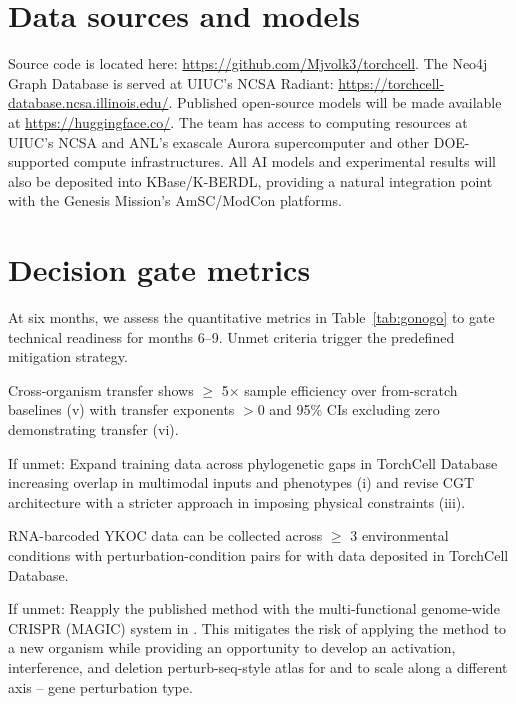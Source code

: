 
\section{Data sources and models}\label{sec:data}

Source code is located here: \url{https://github.com/Mjvolk3/torchcell}. The Neo4j
Graph Database is served at UIUC's NCSA Radiant:
\url{https://torchcell-database.ncsa.illinois.edu/}. Published open-source models
will be made available at \url{https://huggingface.co/}. The team has access to
computing resources at UIUC's NCSA and ANL's exascale Aurora supercomputer and other
DOE-supported compute infrastructures. All AI models and experimental results will
also be deposited into KBase/K-BERDL, providing a natural integration point with the
Genesis Mission's AmSC/ModCon platforms.

\section{Decision gate metrics}\label{sec:gates}

At six months, we assess the quantitative metrics in Table~\ref{tab:gonogo} to gate
technical readiness for months 6--9. Unmet criteria trigger the predefined
mitigation strategy.

 Cross-organism transfer shows $\geq$
5$\times$ sample efficiency over from-scratch baselines (v) with transfer exponents
$> 0$ and 95\% CIs excluding zero demonstrating transfer (vi).

 If unmet: Expand training data across phylogenetic gaps in
TorchCell Database increasing overlap in multimodal inputs and phenotypes (i) and
revise CGT architecture with a stricter approach in imposing physical constraints
(iii).

 RNA-barcoded YKOC data can be collected
across $\geq$ 3 environmental conditions with perturbation-condition pairs for
 with data deposited in TorchCell Database.

 If unmet: Reapply the published method with the multi-functional
genome-wide CRISPR (MAGIC) system in . This mitigates the risk of
applying the method to a new organism while providing an opportunity to develop an
activation, interference, and deletion perturb-seq-style atlas for
 and to scale along a different axis -- gene perturbation type.
